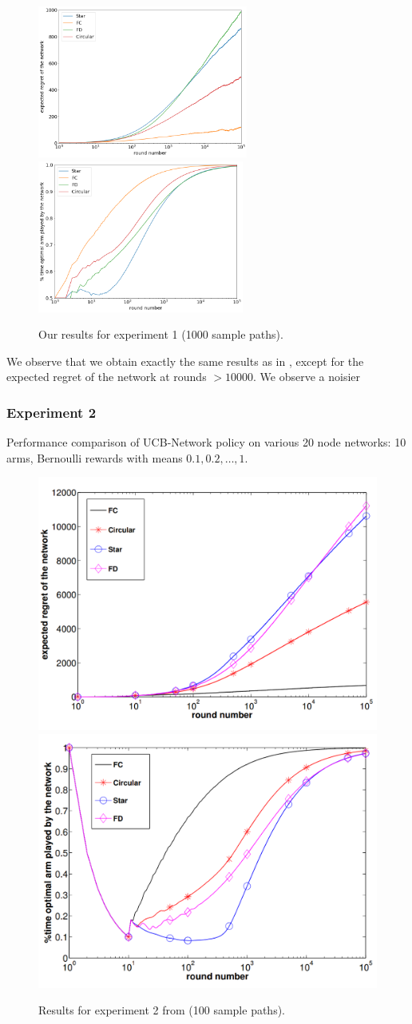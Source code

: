 \documentclass{article}
\begin{document}
\begin{figure}[H]
  \centering
  \includegraphics[height=5cm]{fig1_1_ours.png}
  \includegraphics[height=5cm]{fig1_2_ours.png}
  \caption{Our results for experiment 1 (1000 sample paths).}
\end{figure}

We observe that we obtain exactly the same results as in \cite{DBLP:journals/corr/KollaJG16}, except for the expected regret of the network at rounds $ > 10000$. We observe a noisier

\subsubsection{Experiment 2}

Performance comparison of UCB-Network policy on various 20 node networks: 10 arms, Bernoulli rewards with means $0.1, 0.2, \dots, 1$.

\begin{figure}[H]
  \centering
  \includegraphics[width=0.49\linewidth]{fig2_1.png}
  \includegraphics[width=0.49\linewidth]{fig2_2.png}
  \caption{Results for experiment 2 from \cite{DBLP:journals/corr/KollaJG16} (100 sample paths).}
\end{figure}
\end{document}
